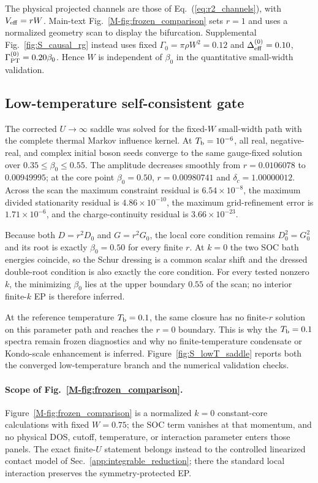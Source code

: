 \documentclass[%
  aps,prb,reprint,amsmath,amssymb,superscriptaddress,longbibliography,floatfix
]{revtex4-2}
\begin{document}
The physical projected channels are those of Eq.~(\ref{eq:r2_channels}), with
$V_{\rm eff}=rW$.  Main-text Fig.~\ref{M-fig:frozen_comparison} sets $r=1$
and uses a normalized geometry scan to display
the bifurcation.  Supplemental Fig.~\ref{fig:S_causal_rg} instead uses fixed
$\Gamma_0=\pi\rho W^2=0.12$ and
$\Delta_{\rm eff}^{(0)}=0.10$,
$\Gamma_{\rm PT}^{(0)}=0.20\beta_0$.  Hence $W$ is independent of
$\beta_0$ in the quantitative small-width validation.

\subsection{Low-temperature self-consistent gate}
\label{app:lowT_gate}

The corrected $U\to\infty$ saddle was solved for the fixed-$W$ small-width
path with the complete thermal Markov influence kernel.  At
$T_{\rm b}=10^{-6}$, all real, negative-real, and complex initial boson seeds
converge to the same gauge-fixed solution over
$0.35\leq\beta_0\leq0.55$.  The amplitude decreases smoothly from
$r=0.0106078$ to $0.00949995$; at the core point $\beta_0=0.50$,
$r=0.00980741$ and $\delta_c=1.00000012$.  Across the scan the maximum
constraint residual is $6.54\times10^{-8}$, the maximum divided
stationarity residual is $4.86\times10^{-10}$, the maximum grid-refinement
error is $1.71\times10^{-6}$, and the charge-continuity residual is
$3.66\times10^{-23}$.

Because both $D=r^2D_0$ and $G=r^2G_0$, the local core condition remains
$D_0^2=G_0^2$ and its root is exactly $\beta_0=0.50$ for every finite
$r$.  At $k=0$ the two SOC bath energies coincide, so the Schur dressing is a
common scalar shift and the dressed double-root condition is also exactly the
core condition.  For every tested nonzero $k$, the minimizing $\beta_0$ lies
at the upper boundary $0.55$ of the scan; no interior finite-$k$ EP is
therefore inferred.

At the reference temperature $T_{\rm b}=0.1$, the same closure has no
finite-$r$ solution on this parameter path and reaches the $r=0$ boundary.
This is why the $T_{\rm b}=0.1$ spectra remain frozen diagnostics and why no
finite-temperature condensate or Kondo-scale enhancement is inferred.
Figure~\ref{fig:S_lowT_saddle} reports both the converged low-temperature
branch and the numerical validation checks.

\paragraph{Scope of Fig.~\ref{M-fig:frozen_comparison}.}
Figure~\ref{M-fig:frozen_comparison} is a normalized $k=0$
constant-core calculations with fixed $W=0.75$; the SOC term vanishes at
that momentum, and no physical DOS, cutoff, temperature, or interaction
parameter enters those panels.  The exact
finite-\(U\) statement belongs instead to the controlled linearized contact
model of Sec.~\ref{app:integrable_reduction}; there the standard local
interaction preserves the symmetry-protected EP.
\end{document}
